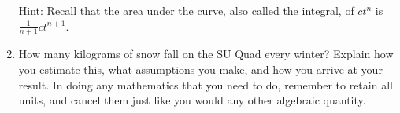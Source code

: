 \documentclass[12pt]{article}
\begin{document}
\begin{enumerate}
Hint: Recall that the area under the curve, also called the integral, of $ct^n$ is $\frac{1}{n+1}ct^{n+1}$.

\item How many kilograms of snow fall on the SU Quad every winter? Explain how you estimate this, what assumptions you make, and how you arrive at your result. In doing any mathematics that you need to do, remember to retain all units, and cancel them just like
you would any other algebraic quantity.

\end{enumerate}
\end{document}
